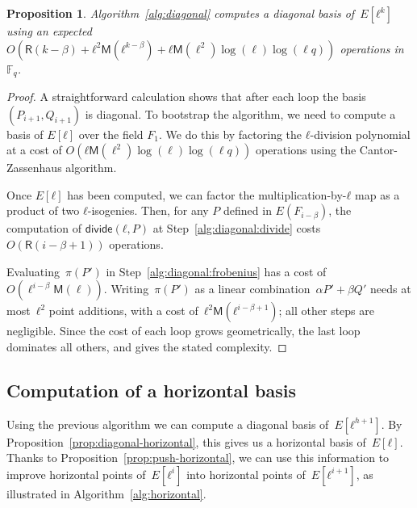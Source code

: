 \documentclass{lms}
\newtheorem{prop}[thm]{Proposition}
\def\cout#1{\mathsf{#1}}
\def\sfdiv{\mathsf{divide}}
\newcommand{\F}{\mathbb{F}}
\newcommand{\MM}{\cout{M}}
\newcommand{\RR}{\cout{R}}
\begin{document}
\begin{prop}\label{th:diagonal}
  Algorithm~\ref{alg:diagonal} computes a diagonal basis of~$E[ℓ^k]$
  using an expected
  $O(\RR(k-\beta) + ℓ^2\MM(ℓ^{k-β}) + ℓ\MM(\ell^2)\log(\ell)\log(\ell
  q))$ operations in $\F_q$.
\end{prop}
\begin{proof}
  A straightforward calculation shows that after each loop the basis
  $(P_{i+1},Q_{i+1})$ is diagonal.
  To bootstrap the algorithm, we need to compute a basis of $E[ℓ]$
  over the field $F_1$. We do this by factoring the $ℓ$-division
  polynomial at a cost of $O(ℓ\MM(\ell^2)\log(\ell)\log(\ell q))$
  operations using the Cantor-Zassenhaus algorithm.

  Once $E[ℓ]$ has been computed, we can factor the
  multiplication-by-$ℓ$ map as a product of two $ℓ$-isogenies. Then,
  for any $P$ defined in $E(F_{i-β})$, the computation of
  $\sfdiv(ℓ, P)$ at Step~\ref{alg:diagonal:divide} costs $O(\RR(i-β+1))$
  operations.

  Evaluating~$π(P')$ in Step~\ref{alg:diagonal:frobenius} has a cost
  of~$O(\ell^{i-\beta}\MM(\ell))$.
  Writing~$π(P')$ as a linear combination~$α P' + β Q'$ needs at
  most~$ℓ^2$ point additions, with a cost of~$ℓ^2
  \mathsf{M}(ℓ^{i-\beta+1})$; all other steps are negligible.  Since
  the cost of each loop grows geometrically, the last loop dominates
  all others, and gives the stated complexity.
\end{proof}

\subsection{Computation of a horizontal basis}
\label{ss:horizontal}

Using the previous algorithm
we can compute a diagonal basis of~$E[ℓ^{h+1}]$.
By Proposition~\ref{prop:diagonal-horizontal},
this gives us a horizontal basis of~$E[ℓ]$.
Thanks to Proposition~\ref{prop:push-horizontal},
we can use this information to improve horizontal points of~$E[ℓ^i]$
into horizontal points of~$E[ℓ^{i+1}]$, as illustrated in
Algorithm~\ref{alg:horizontal}.
\end{document}
